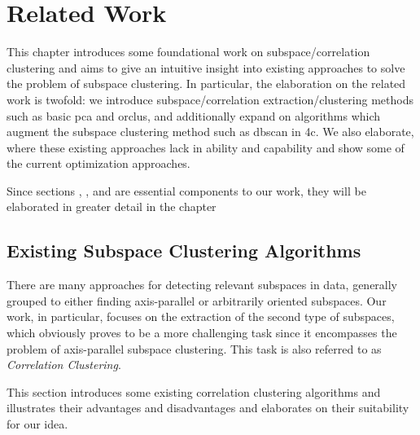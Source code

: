 \chapter{Related Work}
\label{sec:Related Work}
This chapter introduces some foundational work on subspace/correlation clustering and aims to give an intuitive insight into existing approaches to solve the problem of subspace clustering. In particular, the elaboration on the related work is twofold: we introduce subspace/correlation extraction/clustering methods such as basic \acrshort{pca} and \acrshort{orclus}, and additionally expand on algorithms which augment the subspace clustering method such as \acrshort{dbscan} in \acrshort{4c}. We also elaborate, where these existing approaches lack in ability and capability and show some of the current optimization approaches.

Since sections , ,  and  are essential components to our work, they will be elaborated in greater detail in the chapter 

\section{Existing Subspace Clustering Algorithms}
There are many approaches for detecting relevant subspaces in data, generally grouped to either finding axis-parallel or arbitrarily oriented subspaces. Our work, in particular, focuses on the extraction of the second type of subspaces, which obviously proves to be a more challenging task since it encompasses the problem of axis-parallel subspace clustering. This task is also referred to as \textit{Correlation Clustering}. 

This section introduces some existing correlation clustering algorithms and illustrates  their advantages and disadvantages and elaborates on their suitability for our idea.

